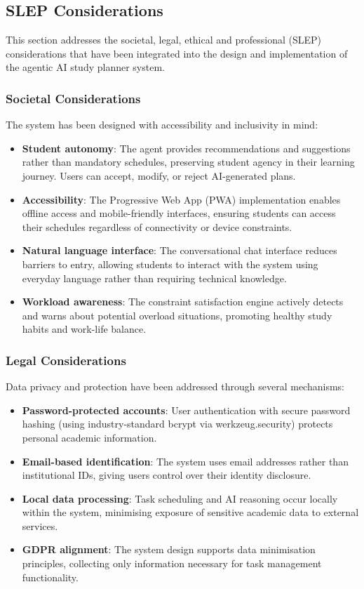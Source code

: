 \documentclass[12pt]{article}
\begin{document}
\subsection{SLEP Considerations}

This section addresses the societal, legal, ethical and professional (SLEP) considerations that have been integrated into the design and implementation of the agentic AI study planner system.

\subsubsection{Societal Considerations}
The system has been designed with accessibility and inclusivity in mind:
\begin{itemize}
    \item \textbf{Student autonomy}: The agent provides recommendations and suggestions rather than mandatory schedules, preserving student agency in their learning journey. Users can accept, modify, or reject AI-generated plans.
    \item \textbf{Accessibility}: The Progressive Web App (PWA) implementation enables offline access and mobile-friendly interfaces, ensuring students can access their schedules regardless of connectivity or device constraints.
    \item \textbf{Natural language interface}: The conversational chat interface reduces barriers to entry, allowing students to interact with the system using everyday language rather than requiring technical knowledge.
    \item \textbf{Workload awareness}: The constraint satisfaction engine actively detects and warns about potential overload situations, promoting healthy study habits and work-life balance.
\end{itemize}

\subsubsection{Legal Considerations}
Data privacy and protection have been addressed through several mechanisms:
\begin{itemize}
    \item \textbf{Password-protected accounts}: User authentication with secure password hashing (using industry-standard bcrypt via werkzeug.security) protects personal academic information.
    \item \textbf{Email-based identification}: The system uses email addresses rather than institutional IDs, giving users control over their identity disclosure.
    \item \textbf{Local data processing}: Task scheduling and AI reasoning occur locally within the system, minimising exposure of sensitive academic data to external services.
    \item \textbf{GDPR alignment}: The system design supports data minimisation principles, collecting only information necessary for task management functionality.
\end{itemize}
\end{document}
